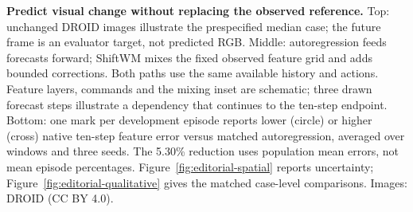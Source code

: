 \textbf{Predict visual change without replacing the observed reference.} Top: unchanged DROID images illustrate the prespecified median case; the future frame is an evaluator target, not predicted RGB. Middle: autoregression feeds forecasts forward; ShiftWM mixes the fixed observed feature grid and adds bounded corrections. Both paths use the same available history and actions. Feature layers, commands and the mixing inset are schematic; three drawn forecast steps illustrate a dependency that continues to the ten-step endpoint. Bottom: one mark per development episode reports lower (circle) or higher (cross) native ten-step feature error versus matched autoregression, averaged over windows and three seeds. The 5.30\% reduction uses population mean errors, not mean episode percentages. Figure~\ref{fig:editorial-spatial} reports uncertainty; Figure~\ref{fig:editorial-qualitative} gives the matched case-level comparisons. Images: DROID (CC BY 4.0).
